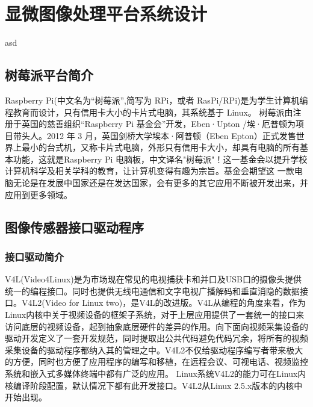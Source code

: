 \chapter{显微图像处理平台系统设计}
%
 asd

 


\section{树莓派平台简介}
Raspberry Pi(中文名为“树莓派”,简写为 RPi，或者 RasPi/RPi)是为学生计算机编程教育而设计，只有信用卡大小的卡片式电脑，其系统基于 Linux。
树莓派由注册于英国的慈善组织“Raspberry Pi 基金会”开发，Eben·Upton /埃·厄普顿为项目带头人。2012 年 3 月，英国剑桥大学埃本·阿普顿（Eben Epton）正式发售世界上最小的台式机，又称卡片式电脑，外形只有信用卡大小，却具有电脑的所有基本功能，这就是Raspberry Pi 电脑板，中文译名"树莓派"！这一基金会以提升学校计算机科学及相关学科的教育，让计算机变得有趣为宗旨。基金会期望这 一款电脑无论是在发展中国家还是在发达国家，会有更多的其它应用不断被开发出来，并应用到更多领域。


\section{图像传感器接口驱动程序}
\subsection{接口驱动简介}
V4L(Video4Linux)是为市场现在常见的电视捕获卡和并口及USB口的摄像头提供统一的编程接口。同时也提供无线电通信和文字电视广播解码和垂直消隐的数据接口。V4L2(Video for Linux two)，是V4L的改进版。V4L从编程的角度来看，作为Linux内核中关于视频设备的框架子系统，对于上层应用提供了一套统一的接口来访问底层的视频设备，起到抽象底层硬件的差异的作用。向下面向视频采集设备的驱动开发定义了一套开发规范，同时提取出公共代码避免代码冗余，将所有的视频采集设备的驱动程序都纳入其的管理之中。V4L2不仅给驱动程序编写者带来极大的方便，同时也方便了应用程序的编写和移植，在远程会议、可视电话、视频监控系统和嵌入式多媒体终端中都有广泛的应用。
Linux系统V4L2的能力可在Linux内核编译阶段配置，默认情况下都有此开发接口。V4L2从Linux 2.5.x版本的内核中开始出现。

